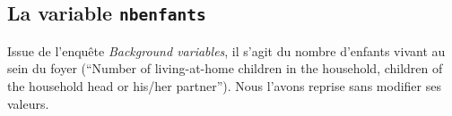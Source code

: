 \documentclass[a4paper, french, 11 pt]{article}\usepackage[]{graphicx}\usepackage[]{xcolor}
\begin{document}
\subsection{La variable \texttt{nbenfants}}

Issue de l'enquête \textit{Background variables}, il s'agit du nombre d'enfants vivant au sein du foyer (\enquote{Number of living-at-home children in the household, children of the household head or his/her partner}). Nous l'avons reprise sans modifier ses valeurs. 
\end{document}
